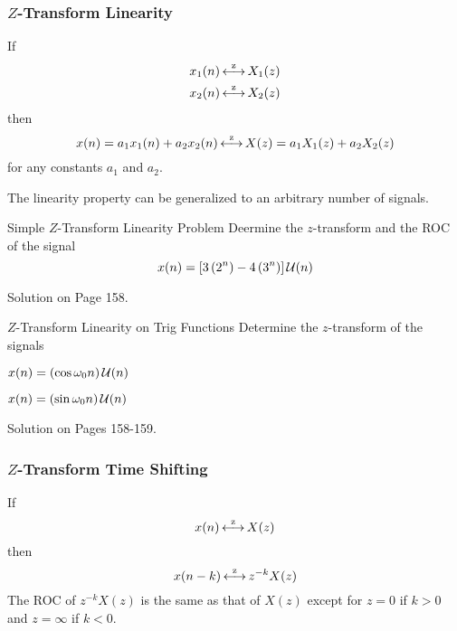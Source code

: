 \subsubsection{\texorpdfstring{$Z$-Transform}{Z-Transform} Linearity}\label{subsubsec:Z-Transform Linearity}
If
\begin{equation*}
  \begin{aligned}
    x_{1}(n) &\operatorname{\overset{z}{\longleftrightarrow}} X_{1}(z) \\
    x_{2}(n) &\operatorname{\overset{z}{\longleftrightarrow}} X_{2}(z) \\
  \end{aligned}
\end{equation*}
then
\begin{equation}\label{eq:Z-Transform Linearity}
  x(n) = a_{1}x_{1}(n) + a_{2}x_{2}(n) \operatorname{\overset{z}{\longleftrightarrow}} X(z) = a_{1}X_{1}(z) + a_{2}X_{2}(z)
\end{equation}
for any constants $a_{1}$ and $a_{2}$.

The linearity property can be generalized to an arbitrary number of signals.

\begin{example}[Example 3.2.1]{Simple \texorpdfstring{$Z$-Transform}{Z-Transform} Linearity Problem}
  Deermine the $z$-transform and the ROC of the signal
  \begin{equation*}
    x(n) = \left[ 3 \left( 2^{n} \right) - 4 \left( 3^{n} \right) \right] \operatorname{\mathcal{U}}(n)
  \end{equation*}

  \tcblower

  Solution on Page 158.
\end{example}

\begin{example}[Example 3.2.2]{\texorpdfstring{$Z$-Transform}{Z-Transform} Linearity on Trig Functions}
  Determine the $z$-transform of the signals
  \begin{boldalphlist}
  \item $x(n) = \left( \cos \omega_{0}n \right) \operatorname{\mathcal{U}}(n)$
  \item $x(n) = \left( \sin \omega_{0}n \right) \operatorname{\mathcal{U}}(n)$
  \end{boldalphlist}

  \tcblower

  Solution on Pages 158-159.
\end{example}

\subsubsection{\texorpdfstring{$Z$-Transform}{Z-Transform} Time Shifting}\label{subsubsec:Z-Transform Time Shifting}
If
\begin{equation*}
  x(n) \operatorname{\overset{z}{\longleftrightarrow}} X(z)
\end{equation*}
then
\begin{equation}\label{eq:Z-Transform Time Shifting}
  x(n-k) \operatorname{\overset{z}{\longleftrightarrow}} z^{-k}X(z)
\end{equation}
The ROC of $z^{-k}X(z)$ is the same as that of $X(z)$ except for $z=0$ if $k > 0$ and $z = \infty$ if $k < 0$.

